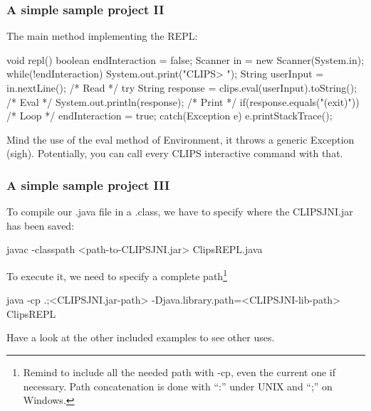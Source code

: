 \documentclass[xcolor={usenames,dvipsnames,svgnames}, compress]{beamer}
\begin{document}
\begin{frame}[fragile]
  \frametitle{A simple sample project II}
  The main method implementing the REPL:
  \begin{java-code}
    void repl() {
      boolean endInteraction = false;
      Scanner in = new Scanner(System.in);
      while(!endInteraction) {
        System.out.print("CLIPS> ");
        String userInput = in.nextLine(); /* Read */
        try {
          String response = clips.eval(userInput).toString(); /* Eval */
          System.out.println(response); /* Print */
          if(response.equals("(exit)")){ /* Loop */
             endInteraction = true;}
        }catch(Exception e) {
          e.printStackTrace();}}}
  \end{java-code}

  Mind the use of the \textsf{eval} method of \textsf{Environment}, it
  throws a generic \textsf{Exception} (sigh). Potentially, you can call
  every CLIPS interactive command with that.
\end{frame}

\begin{frame}[fragile]
  \frametitle{A simple sample project III}
  To compile our \textsf{.java} file in a \textsf{.class}, we have to
  specify where the \textsf{CLIPSJNI.jar} has been saved:
  \begin{clips-code}[numbers=none]
    javac -classpath <path-to-CLIPSJNI.jar> ClipsREPL.java
  \end{clips-code}\bigskip

  To execute it, we need to specify a complete path\footnote{Remind to
  include all the needed path with \textsf{-cp}, even the current one
  if necessary. Path concatenation is done with ``:'' under UNIX and
  ``;'' on Windows.}
  \begin{clips-code}[numbers=none]
    java -cp .;<CLIPSJNI.jar-path> -Djava.library.path=<CLIPSJNI-lib-path> ClipsREPL
  \end{clips-code}\bigskip

  Have a look at the other included examples to see other uses.
\end{frame}
\end{document}
